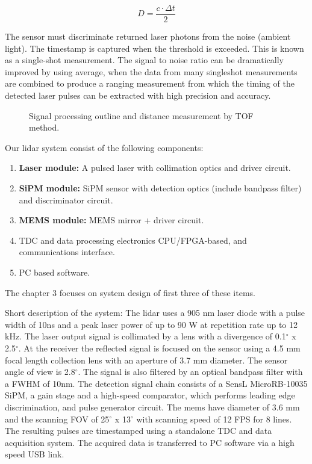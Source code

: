 \begin{equation}\label{eq:peak_power}
D = \frac{c \cdot \Delta t}{2}
\end{equation}

The sensor must discriminate returned laser photons from the noise (ambient light). The timestamp is captured when the threshold is exceeded.
This is known as a single-shot measurement.
The signal to noise ratio can be dramatically improved by using average, when the data from many singleshot measurements are combined
to produce a ranging measurement from which the timing of the detected laser pulses can be extracted with high precision and accuracy.

\begin{figure}[h]
\caption{
Signal processing outline and distance measurement by TOF method.}
\label{fig:algo} 
\end{figure}


Our lidar system consist of the following components:
\begin{enumerate}
\itemsep-0.5em 
\item  \textbf{Laser module:} A pulsed laser with collimation optics and driver circuit.
\item \textbf{SiPM module:} SiPM sensor with detection optics (include bandpass filter) and discriminator circuit.
\item  \textbf{MEMS module:} MEMS mirror + driver circuit.
\item  TDC and data processing electronics CPU/FPGA-based, and communications interface.
\item  PC based software.
\end{enumerate}
The chapter 3 focuses on system design of first three of these items.

Short description of the system:
The lidar uses a 905 nm laser diode with a pulse width of 10ns and a peak laser power of up to 90 W at repetition rate up to 12 kHz.
The laser output signal is collimated by a lens with a divergence of 0.1$^\circ$ x 2.5$^\circ$.
At the receiver the reflected signal is focused on the sensor using a 4.5 mm focal length collection lens with an aperture of 3.7 mm diameter.
The sensor angle of view is 2.8$^\circ$.
The signal is also filtered by an optical bandpass filter with a FWHM of 10nm.
The detection signal chain consists of a SensL MicroRB-10035 SiPM, a gain stage and a high-speed
comparator, which performs leading edge discrimination, and pulse generator circuit.
The mems have diameter of 3.6 mm and the scanning FOV of 25$^\circ$ x 13$^\circ$ with scanning speed of 12 FPS for 8 lines. 
The resulting pulses are timestamped using a standalone TDC and data acquisition system.
The acquired data is transferred to PC software via a high speed USB link.


